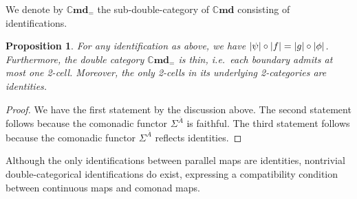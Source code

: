 \documentclass[11pt, oneside, article]{memoir}
\theoremstyle{plain}
\newtheorem{proposition}[theorem]{Proposition}
\theoremstyle{definition}
\theoremstyle{remark}
\DeclarePairedDelimiter{\abs}{\lvert}{\rvert}
\newcommand{\namedcat}[1]{\mathbf{#1}}
\newcommand{\Set}{\namedcat{Set}}
\newcommand{\Cmd}{\mathbb{C}\namedcat{md}}
\newcommand{\CmdSet}{\Cmd}
\newcommand{\CmdId}{\Cmd_=}
\newcommand{\CmdIdSet}{\CmdId}
\newcommand{\clift}[1]{\overline{#1}}
\newcommand{\pts}[1]{{\abs{#1}}}
\newcommand{\one}[1]{\pts{#1}}
\newcommand{\carr}{\Sigma}
\newcommand{\reindex}[1]{\Delta_{#1}}
\newcommand{\car}[1]{\carr^{#1}}
\newcommand{\cmnd}[1]{{#1}}
\newcommand{\cA}{\cmnd{A}}
\begin{document}
We denote by $\CmdIdSet$ the sub-double-category of $\CmdSet$
consisting of identifications.

\begin{proposition}
  For any identification as above, we have
  $\one{\psi} \circ \one{f} = \one{g} \circ \one{\phi}$. Furthermore,
  the double category $\CmdIdSet$ is \emph{thin}, i.e.\ each boundary
  admits at most one 2-cell. Moreover, the only 2-cells in its
  underlying 2-categories are identities.
\end{proposition}
\begin{proof}
  
  We have the first statement by the discussion above. The second
  statement follows because the comonadic functor $\car{\clift{\cA}}$
  is faithful.  The third statement follows because the comonadic
  functor $\car{\clift{\cA}}$ reflects identities.
\end{proof}

Although the only identifications between parallel maps are
identities, nontrivial double-categorical identifications do exist,
expressing a compatibility condition between continuous maps and
comonad maps.
\end{document}
